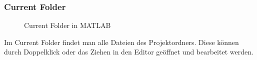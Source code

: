             \subsubsection*{Current Folder}
                \begin{figure}[H]
                    \centering
                    \caption{Current Folder in MATLAB}              
                \end{figure}
                Im Current Folder findet man alle Dateien des Projektordners. Diese können durch Doppelklick oder das Ziehen in den Editor geöffnet und bearbeitet werden.
            \newpage
            